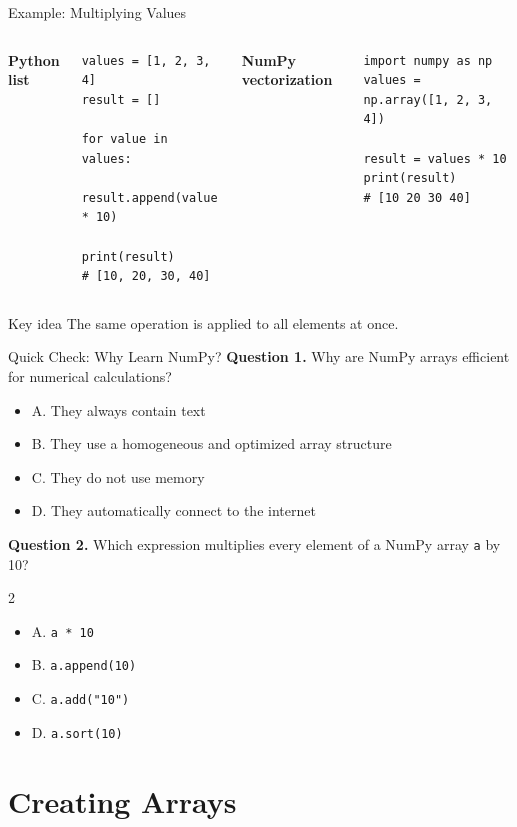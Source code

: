 \documentclass[aspectratio=169,11pt]{beamer}
\newcommand{\quiztitle}[1]{\textbf{\textcolor{QuizOrange}{#1}}}
\begin{document}
\begin{frame}[fragile]{Example: Multiplying Values}
\begin{columns}[T]
\textbf{Python list}
\begin{lstlisting}[style=py]
values = [1, 2, 3, 4]
result = []

for value in values:
    result.append(value * 10)

print(result)
# [10, 20, 30, 40]
\end{lstlisting}
\textbf{NumPy vectorization}
\begin{lstlisting}[style=py]
import numpy as np
values = np.array([1, 2, 3, 4])

result = values * 10
print(result)
# [10 20 30 40]
\end{lstlisting}
\end{columns}
\begin{block}{Key idea}
The same operation is applied to all elements at once.
\end{block}
\end{frame}

\begin{frame}{Quick Check: Why Learn NumPy?}
\small
\quiztitle{Question 1.} Why are NumPy arrays efficient for numerical calculations?
\begin{itemize}
  \item A. They always contain text
  \item B. They use a homogeneous and optimized array structure
  \item C. They do not use memory
  \item D. They automatically connect to the internet
\end{itemize}
\vspace{0.6em}
\quiztitle{Question 2.} Which expression multiplies every element of a NumPy array \texttt{a} by 10?
\begin{multicols}{2}
\begin{itemize}
  \item A. \texttt{a * 10}
  \item B. \texttt{a.append(10)}
  \item C. \texttt{a.add("10")}
  \item D. \texttt{a.sort(10)}
\end{itemize}
\end{multicols}
\end{frame}

\section{Creating Arrays}
\end{document}
